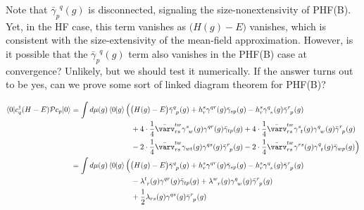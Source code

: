 \documentclass[11pt,letterpaper]{article}
\begin{document}
Note that $\bar{\gamma}_{p\phantom{q}}^{\phantom{p}q}(g)$ is disconnected,
signaling the size-nonextensivity of PHF(B). Yet, in the HF case, this term
vanishes as $\big(H(g) - E\big)$ vanishes, which is consistent with the
size-extensivity of the mean-field approximation.
However, is it possible that the $\bar{\gamma}_{p\phantom{q}}^{\phantom{p}q}(g)$
term also vanishes in the PHF(B) case at convergence?
Unlikely, but we should test it numerically.
If the answer turns out to be yes, can we prove some sort of
linked diagram theorem for PHF(B)?

\begin{subequations}
\begin{align}
  \nonumber
  \braket{0|c^\dag_q (H - E) \mathcal{P} c_p|0}
  &= \int d\mu(g) \braket{0|g}
  \Bigl(
    \big(H(g) - E\big) \bar{\gamma}_{\phantom{q}p}^{q\phantom{p}}(g)
    + h^{s}_{r}\gamma^{qr}(g) \bar\gamma_{sp}(g)-h^{s}_{r}\gamma^{q\phantom{s}}_{\phantom{q}s}(g)\bar\gamma^{r\phantom{p}}_{\phantom{r}p}(g)\\
    \nonumber
    &\hspace{8em}+ 4 \cdot \frac{1}{4}  \bar\varv^{tw}_{rs} \gamma_{\phantom{s}w}^{s\phantom{w}}(g)
        \gamma^{qr}(g)\bar{\gamma}_{tp}(g) 
    + 4 \cdot \frac{1}{4} \bar\varv^{tw}_{rs}\gamma_{\phantom{s}t}^{s\phantom{t}}(g)\gamma_{\phantom{q}w}^{q\phantom{w}}(g)\bar{\gamma}_{\phantom{r}p}^{r\phantom{p}}(g)\\
    &\hspace{8em}- 2 \cdot \frac{1}{4} \bar\varv^{tw}_{rs}\gamma_{wt}(g)\gamma^{qs}(g)\bar{\gamma}_{\phantom{r}p}^{r\phantom{p}}(g)
    - 2 \cdot \frac{1}{4} \bar\varv^{tw}_{rs}\gamma^{rs}(g)\gamma_{\phantom{q}t}^{q\phantom{t}}(g)\bar{\gamma}_{wp}(g)
  \Bigr)\\
  \nonumber
  &= \int d\mu(g) \braket{0|g}
  \Bigl(
    \big(H(g) - E\big) \bar{\gamma}_{\phantom{q}p}^{q\phantom{p}}(g)
    + h^{s}_{r}\gamma^{qr}(g) \bar\gamma_{sp}(g)-h^{s}_{r}\gamma^{q\phantom{s}}_{\phantom{q}s}(g)\bar\gamma^{r\phantom{p}}_{\phantom{r}p}(g)\\
    \nonumber
    &\hspace{8em}- \lambda^{t\phantom{r}}_{\phantom{t}r}(g) 
    \gamma^{qr}(g) \bar{\gamma}_{tp}(g)
    + \lambda^{w\phantom{r}}_{\phantom{w}r}(g) 
    \gamma^{q\phantom{w}}_{\phantom{q}w}(g) \bar{\gamma}^{r\phantom{p}}_{\phantom{r}p}(g)\\
    &\hspace{8em}+ \frac{1}{2} \lambda_{rs}(g)
    \gamma^{qs}(g)
    \bar{\gamma}^{r\phantom{p}}_{\phantom{r}p}(g)

\end{align}
\end{subequations}
\end{document}
